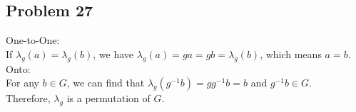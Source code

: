 \subsection*{Problem 27}
\noindent One-to-One: \\
If $\lambda_g(a) = \lambda_g(b)$, we have $\lambda_g(a) = ga = gb = \lambda_g(b)$, which means $a = b$. \\
Onto: \\
For any $b \in G$, we can find that $\lambda_g(g^{-1}b) = gg^{-1}b = b$ and $g^{-1}b \in G$. \\

\noindent Therefore, $\lambda_g$ is a permutation of $G$.

